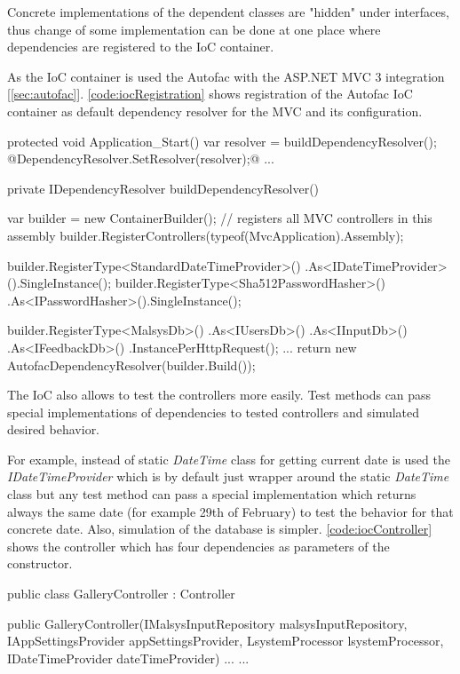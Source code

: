 Concrete implementations of the dependent classes are "hidden" under interfaces, thus change of some implementation can be done at one place where dependencies are registered to the IoC container.

As the IoC container is used the Autofac with the ASP.NET MVC 3 integration [\ref{sec:autofac}].
\autoref{code:iocRegistration} shows registration of the Autofac IoC container as default dependency resolver for the MVC and its configuration.

\begin{Csharp}[label=code:iocRegistration,caption={Registration of the dependency container and its configuration}]
protected void Application_Start() {
	var resolver = buildDependencyResolver();
	@DependencyResolver.SetResolver(resolver);@
	...
}

private IDependencyResolver buildDependencyResolver() {
	var builder = new ContainerBuilder();
	// registers all MVC controllers in this assembly
	builder.RegisterControllers(typeof(MvcApplication).Assembly);
	
	builder.RegisterType<StandardDateTimeProvider>()
		.As<IDateTimeProvider>().SingleInstance();
	builder.RegisterType<Sha512PasswordHasher>()
		.As<IPasswordHasher>().SingleInstance();

	builder.RegisterType<MalsysDb>()
		.As<IUsersDb>()
		.As<IInputDb>()
		.As<IFeedbackDb>()
		.InstancePerHttpRequest();
	...
	return new AutofacDependencyResolver(builder.Build());
}
\end{Csharp}

The IoC also allows to test the controllers more easily.
Test methods can pass special implementations of dependencies to tested controllers and simulated desired behavior.

For example, instead of static \emph{DateTime} class for getting current date is used the \emph{IDateTimeProvider} which is by default just wrapper around the static \emph{DateTime} class but any test method can pass a special implementation which returns always the same date (for example 29th of February) to test the behavior for that concrete date.
Also, simulation of the database is simpler.
\autoref{code:iocController} shows the controller which has four dependencies as parameters of the constructor.

\begin{Csharp}[label=code:iocController,caption={Registration of dependency container and its configuration}]
public class GalleryController : Controller {

	public GalleryController(IMalsysInputRepository malsysInputRepository,
			IAppSettingsProvider appSettingsProvider,
			LsystemProcessor lsystemProcessor,
			IDateTimeProvider dateTimeProvider) {
		...
	}
	...
}
\end{Csharp}


